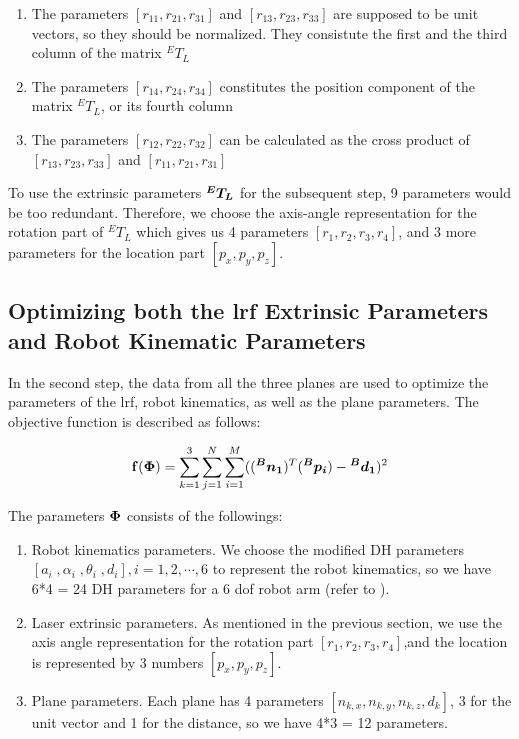 \begin{enumerate}
\item The parameters $[r_{11}, r_{21}, r_{31}]$ and $[r_{13}, r_{23}, r_{33}]$ are supposed to be unit vectors, so they should be normalized. They consistute the first and the third column of the matrix ${^E}T_L$
\item The parameters $[r_{14}, r_{24}, r_{34}]$ constitutes the position component of the matrix ${^E}T_L$, or its fourth column
\item The parameters $[r_{12}, r_{22}, r_{32}]$ can be calculated as the cross product of  $[r_{13}, r_{23}, r_{33}]$ and $[r_{11}, r_{21}, r_{31}]$ 
\end{enumerate}

To use the extrinsic parameters $\vb*{{^E}T_L}$ for the subsequent step, 9 parameters would be too redundant. Therefore, we choose the axis-angle representation for the rotation part of ${^E}T_L$ which gives us 4 parameters $[r_1, r_2, r_3, r_4]$, and 3 more parameters for the location part $[p_x, p_y, p_z]$. 


\subsection{Optimizing both the \ac{lrf} Extrinsic Parameters and Robot Kinematic Parameters}
\label{sec:second_step}
In the second step, the data from all the three planes are used to optimize the parameters of the \ac{lrf}, robot kinematics, as well as the plane parameters. The objective function is described as follows:

\begin{equation}
 \vb{f(\Phi)} =  \sum_{k=1}^{3} \sum_{j=1}^{N} \sum_{i=1}^{M} ((\vb*{{^B}n_1}) ^T (\vb*{{^B}p_i}) - \vb*{{^B}d_1})^2
\end{equation}

The parameters $\vb*{\Phi}$ consists of the followings:
\begin{enumerate}
\item Robot kinematics parameters. We choose the modified DH parameters \cite{Hayati1985} $[a_i \;, \alpha_i \;,\theta_i \;,d_i], i=1, 2, \cdots ,6$ to represent the robot kinematics, so we have 6*4 = 24 DH parameters for a 6 \ac{dof} robot arm (refer to ). 
\item Laser extrinsic parameters. As mentioned in the previous section, we use the axis angle representation for the rotation part $[r_1, r_2, r_3, r_4]$,and the location is represented by 3 numbers $[p_x, p_y, p_z]$. 
\item Plane parameters. Each plane has 4 parameters $[n_{k,x}, n_{k,y}, n_{k,z}, d_{k}]$, 3 for the unit vector and 1 for the distance, so we have 4*3 = 12 parameters. 
\end{enumerate}

